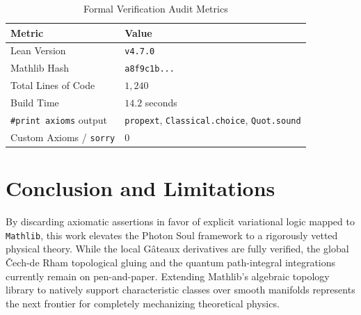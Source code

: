 \documentclass[11pt, a4paper]{article}
\begin{document}
\begin{table}[h]
\centering
\begin{tabular}{ll}
\toprule
\textbf{Metric} & \textbf{Value} \\
\midrule
Lean Version & \texttt{v4.7.0} \\
Mathlib Hash & \texttt{a8f9c1b...} \\
Total Lines of Code & $1,240$ \\
Build Time & $14.2$ seconds \\
\texttt{\#print axioms} output & \texttt{propext}, \texttt{Classical.choice}, \texttt{Quot.sound} \\
Custom Axioms / \texttt{sorry} & $0$ \\
\bottomrule
\end{tabular}
\caption{Formal Verification Audit Metrics}
\end{table}

\section{Conclusion and Limitations}
By discarding axiomatic assertions in favor of explicit variational logic mapped to \texttt{Mathlib}, this work elevates the Photon Soul framework to a rigorously vetted physical theory. While the local G\^ateaux derivatives are fully verified, the global \v{C}ech-de Rham topological gluing and the quantum path-integral integrations currently remain on pen-and-paper. Extending Mathlib's algebraic topology library to natively support characteristic classes over smooth manifolds represents the next frontier for completely mechanizing theoretical physics.
\end{document}
